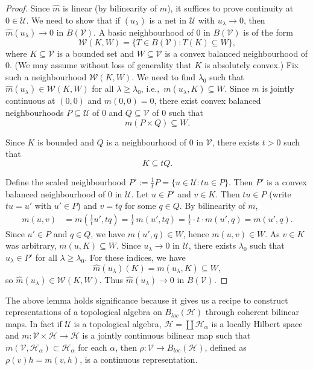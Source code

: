 \documentclass[10pt]{article}
\theoremstyle{definition}
\begin{document}
	\begin{proof}
		Since $\widehat{m}$ is linear (by bilinearity of $m$), it suffices to prove continuity at $0\in\mathcal{U}$. 
		We need to show that if $(u_\lambda)$ is a net in $\mathcal{U}$ with $u_\lambda \to 0$, then 
		$\widehat{m}(u_\lambda)\to 0$ in $B(\mathcal V)$. 			
		A basic neighbourhood of $0$ in $B(\mathcal V)$ is of the form
		\[
		\mathcal{W}(K,W)=\bigl\{T\in B(\mathcal V):T(K)\subseteq W\bigr\},
		\]
		where $K\subseteq \mathcal{V}$ is a bounded set and $W\subseteq \mathcal{V}$ is a convex balanced neighbourhood of $0$. 
		(We may assume without loss of generality that $K$ is absolutely convex.)		
		Fix such a neighbourhood $\mathcal{W}(K,W)$. We need to find $\lambda_0$ such that 
		$\widehat{m}(u_\lambda)\in\mathcal{W}(K,W)$ for all $\lambda\ge\lambda_0$, 
		i.e.,\ $m(u_\lambda,K)\subseteq W$.	Since $m$ is jointly continuous at $(0,0)$ and $m(0,0)=0$, there exist convex balanced 
		neighbourhoods $P\subseteq \mathcal{U}$ of $0$ and $Q\subseteq \mathcal{V}$ of $0$ such that
		\[
		m(P\times Q)\subseteq W.
		\]
		
		
		Since $K$ is bounded and $Q$ is a neighbourhood of $0$ in $\mathcal{V}$, there exists $t>0$ such that
		\[
		K\subseteq tQ.
		\]
		
		
		Define the scaled neighbourhood $			P':=\frac{1}{t}P=\bigl\{u\in\mathcal{U}:tu\in P\bigr\}.$
		Then $P'$ is a convex balanced neighbourhood of $0$ in $\mathcal{U}$.	Let $u\in P'$ and $v\in K$.  
		Then $tu\in P$ (write $tu=u'$ with $u'\in P$) and $v=tq$ for some $q\in Q$. 
		By bilinearity of $m$,
		\begin{align*}
			m(u,v)
			&=m\!\left(\frac{1}{t}u',tq\right)
			=\frac{1}{t}\,m(u',tq)
			=\frac{1}{t}\cdot t\cdot m(u',q)
			=m(u',q).
		\end{align*}
		Since $u'\in P$ and $q\in Q$, we have $m(u',q)\in W$, hence $m(u,v)\in W$. 
		As $v\in K$ was arbitrary, $m(u,K)\subseteq W$.				
		Since $u_\lambda\to 0$ in $\mathcal{U}$, there exists $\lambda_0$ such that 
		$u_\lambda\in P'$ for all $\lambda\ge\lambda_0$. 
		For these indices, we have
		\[
		\widehat{m}(u_\lambda)(K)=m(u_\lambda,K)\subseteq W,
		\]
		so $\widehat{m}(u_\lambda)\in\mathcal{W}(K,W)$. 
		Thus $\widehat{m}(u_\lambda)\to 0$ in $B(\mathcal V)$.
	\end{proof}
	The above lemma holds significance because it gives us a recipe to construct representations of a topological algebra on $B_{loc}(\mathcal H)$ through coherent bilinear maps. In fact if $\mathcal U$ is a topological algebra, $\mathcal H=\coprod \mathcal H_\alpha$ is a locally Hilbert space and $m:\mathcal V\times \mathcal H\to \mathcal H$ is a jointly continuous bilinear map such that $m(\mathcal V, \mathcal H_\alpha)\subset \mathcal H_\alpha$ for each $\alpha$, then $\rho:\mathcal V\to B_{loc}(\mathcal H)$, defined as $\rho(v)h=m(v,h)$, is a continuous representation.\\
	
\end{document}
